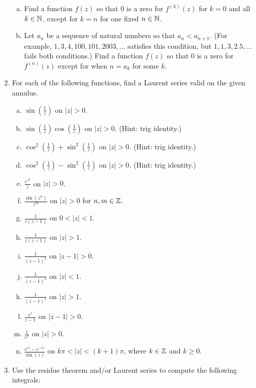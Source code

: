 \begin{enumerate}
\begin{enumerate}[a)]
\item Find a function $f(z)$ so that $0$ is a zero for $f^{(k)}(z)$ for $k = 0$ and all $k\in \mathbb{N}$, except for $k = n$ for one fixed $n \in \mathbb{N}$.

\item Let $a_n$ be a sequence of natural numbers so that $a_n < a_{n+1}$. (For example, $1,3,4,100,101,2003,...$ satisfies this condition, but $1,1,3,2.5,...$ fails both conditions.) Find a function $f(z)$ so that $0$ is a zero for $f^{(n)}(z)$ except for when $n = a_k$ for some $k$.

\end{enumerate}

\item For each of the following functions, find a Laurent series valid on the given annulus.

\begin{enumerate}[a)]
\item $\sin\left(\frac{1}{z}\right)$ on $|z| > 0$.
\item $\sin\left(\frac{1}{z}\right)\cos\left(\frac{1}{z}\right)$ on $|z| > 0$. (Hint: trig identity.)
\item $\cos^2\left(\frac{1}{z}\right) + \sin^2\left(\frac{1}{z}\right)$ on $|z| > 0$. (Hint: trig identity.)
\item $\cos^2\left(\frac{1}{z}\right) - \sin^2\left(\frac{1}{z}\right)$ on $|z| > 0$. (Hint: trig identity.)
\item $\frac{e^{z^2}}{z}$ on $|z| > 0$.
\item $\frac{\sin(z^n)}{z^m}$ on $|z| > 0$ for $n,m \in \mathbb{Z}$.
\item $\frac{1}{z(z-1)}$ on $0 < |z| < 1$.
\item $\frac{1}{z(z-1)}$ on $|z| > 1$.
\item $\frac{1}{(z-1)^2}$ on $|z - 1|> 0$.
\item $\frac{1}{(z-1)^2}$ on $|z| < 1$.
\item $\frac{1}{(z-1)^2}$ on $|z| > 1$.
\item $\frac{e^z}{z-1}$ on $|z - 1|>0$.
\item $\frac{1}{e^z}$ on $|z| > 0$.
\item $\frac{e^{iz} - e^{-iz}}{\sin(z)}$ on $k\pi < |z| < (k+1)\pi$, where $k\in \mathbb{Z}$ and $k\ge 0$.

\end{enumerate}

\item Use the residue theorem and/or Laurent series to compute the following integrals:


\end{enumerate}
